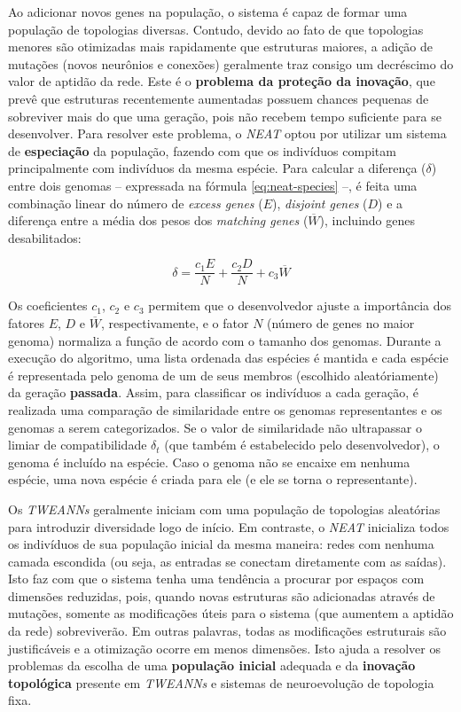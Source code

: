 
Ao adicionar novos genes na população, o sistema é capaz de formar uma população
de topologias diversas. Contudo, devido ao fato de que topologias menores são
otimizadas mais rapidamente que estruturas maiores, a adição de mutações (novos
neurônios e conexões) geralmente traz consigo um decréscimo do valor de aptidão
da rede. Este é o \textbf{problema da proteção da inovação}, que prevê que
estruturas recentemente aumentadas possuem chances pequenas de sobreviver mais
do que uma geração, pois não recebem tempo suficiente para se desenvolver. Para
resolver este problema, o \textit{NEAT} optou por utilizar um sistema de
\textbf{especiação} da população, fazendo com que os indivíduos compitam
principalmente com indivíduos da mesma espécie. Para calcular a diferença
($\delta$) entre dois genomas -- expressada na fórmula \ref{eq:neat-species}
--, é feita uma combinação linear do número de \textit{excess genes} ($E$),
\textit{disjoint genes} ($D$) e a diferença entre a média dos pesos dos
\textit{matching genes} ($\overline{W}$), incluindo genes desabilitados:	

\begin{equation}
\label{eq:neat-species}
\delta = \frac{c_1E}{N} + \frac{c_2D}{N} + c_3\overline{W}
\end{equation}

Os coeficientes $c_1$, $c_2$ e $c_3$ permitem que o desenvolvedor ajuste a
importância dos fatores $E$, $D$ e $\overline{W}$, respectivamente, e o fator
$N$ (número de genes no maior genoma) normaliza a função de acordo com o tamanho
dos genomas. Durante a execução do algoritmo, uma lista ordenada das espécies é
mantida e cada espécie é representada pelo genoma de um de seus membros
(escolhido aleatóriamente) da geração \textbf{passada}. Assim, para classificar
os indivíduos a cada geração, é realizada uma comparação de similaridade entre
os genomas representantes e os genomas a serem categorizados. Se o valor de
similaridade não ultrapassar o limiar de compatibilidade $\delta_t$ (que também
é estabelecido pelo desenvolvedor), o genoma é incluído na espécie. Caso o
genoma não se encaixe em nenhuma espécie, uma nova espécie é criada para ele (e
ele se torna o representante).

Os \textit{TWEANNs} geralmente iniciam com uma população de topologias
aleatórias para introduzir diversidade logo de início. Em contraste, o
\textit{NEAT} inicializa todos os indivíduos de sua população inicial da mesma
maneira: redes com nenhuma camada escondida (ou seja, as entradas se conectam
diretamente com as saídas). Isto faz com que o sistema tenha uma tendência a
procurar por espaços com dimensões reduzidas, pois, quando novas estruturas são
adicionadas através de mutações, somente as modificações úteis para o sistema
(que aumentem a aptidão da rede) sobreviverão. Em outras palavras, todas as
modificações estruturais são justificáveis e a otimização ocorre em menos
dimensões. Isto ajuda a resolver os problemas da escolha de uma
\textbf{população inicial} adequada e da \textbf{inovação topológica} presente
em \textit{TWEANNs} e sistemas de neuroevolução de topologia fixa.


